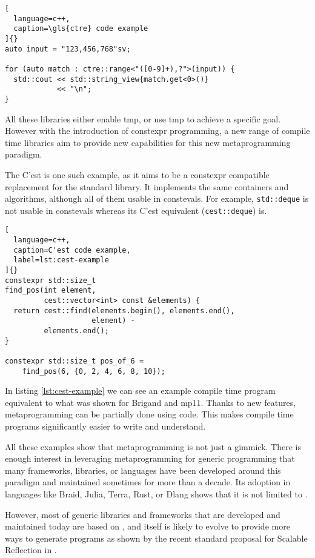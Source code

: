 \documentclass[../main]{subfiles}
\begin{document}
\begin{lstlisting}[
  language=c++,
  caption=\gls{ctre} code example
]{}
auto input = "123,456,768"sv;

for (auto match : ctre::range<"([0-9]+),?">(input)) {
  std::cout << std::string_view{match.get<0>()}
            << "\n";
}
\end{lstlisting}

All these libraries either enable \gls{tmp}, or use \gls{tmp} to achieve
a specific goal. However with the introduction of \gls{constexpr} programming,
a new range of compile time libraries aim to provide new capabilities
for this new metaprogramming paradigm.

The C'est\cite{cest} is one such example, as it aims to be a \gls{constexpr}
compatible replacement for the \cpp standard library. It implements the same
containers and algorithms, although all of them usable in \glspl{consteval}.
For example, \lstinline{std::deque} is not usable in \glspl{consteval} whereas
its C'est equivalent (\lstinline{cest::deque}) is.

\begin{lstlisting}[
  language=c++,
  caption=C'est code example,
  label=lst:cest-example
]{}
constexpr std::size_t
find_pos(int element,
         cest::vector<int> const &elements) {
  return cest::find(elements.begin(), elements.end(),
                    element) -
         elements.end();
}

constexpr std::size_t pos_of_6 =
    find_pos(6, {0, 2, 4, 6, 8, 10});
\end{lstlisting}

In listing \ref{lst:cest-example} we can see an example compile time program
equivalent to what was shown for Brigand and mp11. Thanks to new \cpp features,
metaprogramming can be partially done using \cpp code. This makes
compile time programs significantly easier to write and understand.

All these examples show that metaprogramming is not just a gimmick.
There is enough interest in leveraging metaprogramming
for generic programming that many frameworks, libraries, or languages
have been developed around this paradigm and maintained sometimes
for more than a decade. Its adoption in languages like Braid, Julia, Terra,
Rust, or Dlang shows that it is not limited to \cpp.

However, most of generic libraries and frameworks that are developed
and maintained today are based on \cpp, and \cpp itself is likely to
evolve to provide more ways to generate programs as shown by the recent
standard proposal for Scalable Reflection in \cpp \cite{scalable-reflection}.
\end{document}
